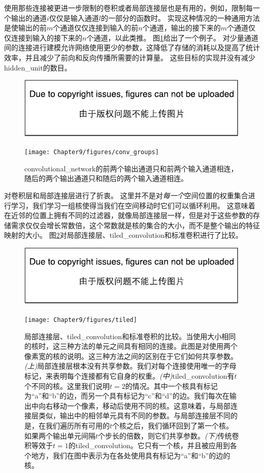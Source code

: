 使用那些连接被更进一步限制的卷积或者局部连接层也是有用的，例如，限制每一个输出的通道$i$仅仅是输入通道$l$的一部分的函数时。
实现这种情况的一种通用方法是使输出的前$m$个通道仅仅连接到输入的前$n$个通道，输出的接下来的$m$个通道仅仅连接到输入的接下来的$n$个通道，以此类推。
图\ref{fig:chap9_conv_groups}给出了一个例子。
对少量通道间的连接进行建模允许网络使用更少的参数，这降低了存储的消耗以及提高了统计效率，并且减少了前向和反向传播所需要的计算量。
这些目标的实现并没有减少\gls{hidden_unit}的数目。
\begin{figure}[!htb]
\ifOpenSource
\centerline{\includegraphics{figure.pdf}}
\else
\centerline{\texttt{[image: Chapter9/figures/conv\_groups]}}
\fi
\caption{\gls{convolutional_network}的前两个输出通道只和前两个输入通道相连，随后的两个输出通道只和随后的两个输入通道相连。}
\label{fig:chap9_conv_groups}
\end{figure}

\citep{Gregor+LeCun-2010,Le2010}对卷积层和局部连接层进行了折衷。
这里并不是对\emph{每一个}空间位置的权重集合进行学习，我们学习一组核使得当我们在空间移动时它们可以循环利用。
这意味着在近邻的位置上拥有不同的过滤器，就像局部连接层一样，但是对于这些参数的存储需求仅仅会增长常数倍，这个常数就是核的集合的大小，而不是整个输出的特征映射的大小。
图\ref{fig:chap9_tiled}对局部连接层、\gls{tiled_convolution}和标准卷积进行了比较。
\begin{figure}[!htb]
\ifOpenSource
\centerline{\includegraphics{figure.pdf}}
\else
\centerline{\texttt{[image: Chapter9/figures/tiled]}}
\fi
\captionsetup{singlelinecheck=off}
\caption[.]{局部连接层、\gls{tiled_convolution}和标准卷积的比较。当使用大小相同的核时，这三种方法的单元之间具有相同的连接。此图是对使用两个像素宽的核的说明。这三种方法之间的区别在于它们如何共享参数。\emph{(上)}局部连接层根本没有共享参数。我们对每个连接使用唯一的字母标记，来表明每个连接都有它自身的权重。\emph{(中)}\gls{tiled_convolution}有$t$个不同的核。这里我们说明$t=2$的情况。其中一个核具有标记为``a''和``b''的边，而另一个具有标记为``c''和``d''的边。我们每次在输出中向右移动一个像素，移动后使用不同的核。这意味着，与局部连接层类似，输出中的相邻单元具有不同的参数。与局部连接层不同的是，在我们遍历所有可用的$t$个核之后，我们循环回到了第一个核。如果两个输出单元间隔$t$个步长的倍数，则它们共享参数。\emph{(下)}传统卷积等效于$t=1$的\gls{tiled_convolution}。它只有一个核，并且被应用到各个地方，我们在图中表示为在各处使用具有标记为``a''和``b''的边的核。}
\label{fig:chap9_tiled}
\end{figure}
 
